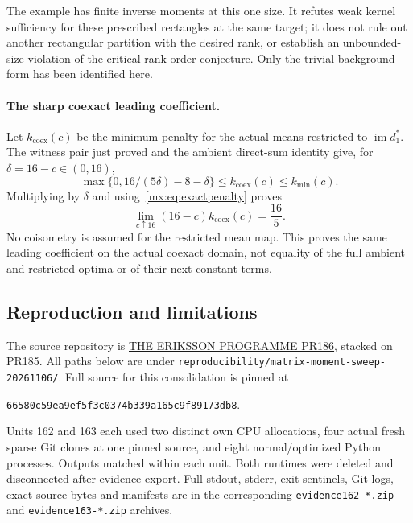 \documentclass[11pt]{article}
\providecommand{\im}{\operatorname{im}}
\begin{document}
The example has finite inverse moments at this one size. It refutes weak
kernel sufficiency for these prescribed rectangles at the same target;
it does not rule out another rectangular partition with the desired rank,
or establish an unbounded-size violation of the critical rank-order
conjecture. Only the trivial-background form has been identified here.


\paragraph{The sharp coexact leading coefficient.}
Let $k_{\mathrm{coex}}(c)$ be the minimum penalty for the actual means
restricted to $\im d_1^*$. The witness pair just proved and the ambient
direct-sum identity give, for $\delta=16-c\in(0,16)$,
\[
 \max\{0,16/(5\delta)-8-\delta\}
 \leq k_{\mathrm{coex}}(c)\leq k_{\min}(c).
\]
Multiplying by $\delta$ and using~\eqref{mx:eq:exactpenalty} proves
\[
 \lim_{c\uparrow16}(16-c)k_{\mathrm{coex}}(c)=\frac{16}{5}.
\]
No coisometry is assumed for the restricted mean map. This proves the
same leading coefficient on the actual coexact domain, not equality of
the full ambient and restricted optima or of their next constant terms.

\subsection{Reproduction and limitations}\label{mx:sec:evidence}
The source repository is
\href{https://github.com/lluiseriksson/THE-ERIKSSON-PROGRAMME/pull/186}{THE ERIKSSON PROGRAMME PR186},
stacked on PR185. All paths below are under
\texttt{reproducibility/matrix-moment-sweep-20261106/}.
Full source for this consolidation is pinned at
\begin{center}\small\texttt{66580c59ea9ef5f3c0374b339a165c9f89173db8}.\end{center}
Units 162 and 163 each used two distinct own CPU allocations, four actual
fresh sparse Git clones at one pinned source, and eight normal/optimized
Python processes. Outputs matched within each unit. Both runtimes were
deleted and disconnected after evidence export. Full stdout, stderr, exit
sentinels, Git logs, exact source bytes and manifests are in the corresponding
\texttt{evidence162-*.zip} and \texttt{evidence163-*.zip} archives.
\end{document}
